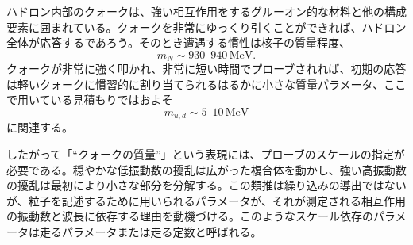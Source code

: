 ハドロン内部のクォークは、強い相互作用をするグルーオン的な材料と他の構成要素に囲まれている。クォークを非常にゆっくり引くことができれば、ハドロン全体が応答するであろう。そのとき遭遇する慣性は核子の質量程度、
\begin{equation}
m_N\sim930\text{--}940\,\mathrm{MeV}.
\end{equation}
クォークが非常に強く叩かれ、非常に短い時間でプローブされれば、初期の応答は軽いクォークに慣習的に割り当てられるはるかに小さな質量パラメータ、ここで用いている見積もりではおよそ
\begin{equation}
m_{u,d}\sim5\text{--}10\,\mathrm{MeV}
\end{equation}
に関連する。

したがって「``クォークの質量''」という表現には、プローブのスケールの指定が必要である。穏やかな低振動数の擾乱は広がった複合体を動かし、強い高振動数の擾乱は最初により小さな部分を分解する。この類推は繰り込みの導出ではないが、粒子を記述するために用いられるパラメータが、それが測定される相互作用の振動数と波長に依存する理由を動機づける。このようなスケール依存のパラメータは走るパラメータまたは走る定数と呼ばれる。

\begin{classroomqa}
\end{classroomqa}

\begin{classroomqa}
\end{classroomqa}

\begin{classroomqa}
\end{classroomqa}

